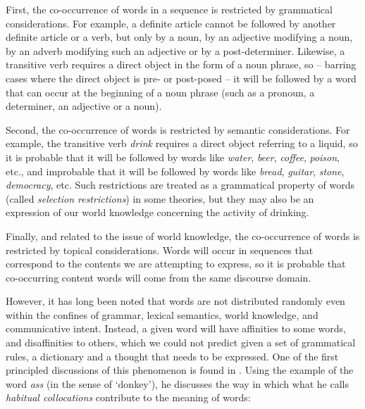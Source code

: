 First, the co\hyp{}occurrence of words in a sequence is restricted by grammatical considerations. For example, a definite article  cannot be followed by another definite article or a verb,  but only by a noun,  by an adjective modifying a noun, by an adverb  modifying such an adjective or by a post\hyp{}determiner.  Likewise, a transitive  verb requires a direct object in the form of a noun phrase, so -- barring cases where the direct object is pre- or post\hyp{}posed -- it will be followed by a word that can occur at the beginning of a noun  phrase (such as a pronoun,  a determiner,  an adjective or a noun).

Second, the co\hyp{}occurrence of words is restricted by semantic  considerations. For example, the transitive  verb  \textit{drink} requires a direct object referring to a liquid, so it is probable that it will be followed by words like \textit{water}, \textit{beer}, \textit{coffee}, \textit{poison}, etc., and improbable that it will be followed by words like \textit{bread}, \textit{guitar}, \textit{stone}, \textit{democracy}, etc. Such restrictions are treated as a grammatical property of words (called \textit{selection restrictions}) in some theories, but they may also be an expression of our world knowledge concerning the activity of drinking.

Finally, and related to the issue of world knowledge, the co\hyp{}occurrence of words is restricted by topical considerations. Words will occur in sequences that correspond to the contents we are attempting to express, so it is probable that co\hyp{}occurring content words will come from the same discourse domain.

However, it has long been noted that words are not distributed  randomly  even within the confines of grammar, lexical semantics,  world knowledge, and communicative intent. Instead, a given word will have affinities to some words, and disaffinities to others, which we could not predict given a set of grammatical rules, a dictionary  and a thought that needs to be expressed. One of the first principled discussions of this phenomenon is found in \citet{firth_papers_1957}. Using the example of the word \textit{ass} (in the sense of `donkey'), he discusses the way in which what he calls \textit{habitual collocations}  contribute to the meaning of words:

